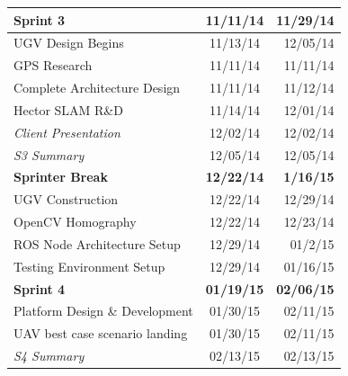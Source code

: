 \begin{table}[!bh]
\begin{tabular}{|| l || c | r || }
\textbf{Sprint 3}  &  \textbf{11/11/14} & \textbf{11/29/14} \\
\hline
\hspace{15pt}UGV Design Begins  &  11/13/14   & 12/05/14 \\
\hline
\hspace{15pt}GPS Research  &  11/11/14   & 11/11/14 \\
\hline
\hspace{15pt}Complete Architecture Design   & 11/11/14  &  11/12/14 \\
\hline
\hspace{15pt}Hector SLAM R\&D   & 11/14/14   & 12/01/14 \\
\hline
\hspace{30pt}\textit{Client Presentation}  &  12/02/14  &  12/02/14 \\
\hline
\hspace{30pt}\textit{S3 Summary}   & 12/05/14  &  12/05/14 \\
\hline


\textbf{Sprinter Break}  & \textbf{ 12/22/14 }  & \textbf{1/16/15} \\
\hline
\hspace{15pt}UGV Construction  &  12/22/14   & 12/29/14 \\
\hline
\hspace{15pt}OpenCV Homography  &  12/22/14   & 12/23/14 \\
\hline
\hspace{15pt}ROS Node Architecture Setup   & 12/29/14  &  01/2/15 \\
\hline
\hspace{15pt}Testing Environment Setup   & 12/29/14  &  01/16/15 \\
\hline


\textbf{Sprint 4}   & \textbf{01/19/15} & \textbf{02/06/15} \\
\hline
\hspace{15pt}Platform Design \& Development  &  01/30/15  &  02/11/15 \\
\hline
\hspace{15pt}UAV best case scenario landing  &  01/30/15  &  02/11/15 \\
\hline
\hspace{30pt}\textit{S4 Summary}  &  02/13/15   & 02/13/15 \\
\hline



\end{tabular}
\end{table}
